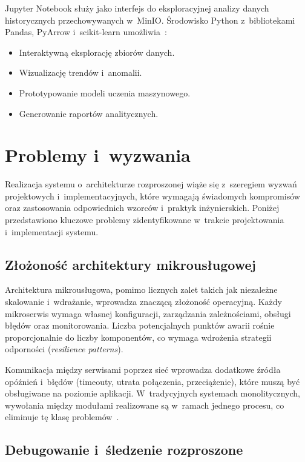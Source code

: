 Jupyter Notebook służy jako interfejs do eksploracyjnej analizy danych historycznych przechowywanych w~MinIO\@.
Środowisko Python z~bibliotekami Pandas, PyArrow i~scikit-learn umożliwia~\cite{jupyter_docs}:
\begin{itemize}
    \item Interaktywną eksplorację zbiorów danych.
    \item Wizualizację trendów i~anomalii.
    \item Prototypowanie modeli uczenia maszynowego.
    \item Generowanie raportów analitycznych.
\end{itemize}


\section[Problemy i wyzwania]{Problemy i~wyzwania}
\label{sec:problemy_wyzwania}

Realizacja systemu o~architekturze rozproszonej wiąże się z~szeregiem wyzwań projektowych i~implementacyjnych,
które wymagają świadomych kompromisów oraz zastosowania odpowiednich wzorców i~praktyk inżynierskich.
Poniżej przedstawiono kluczowe problemy zidentyfikowane w~trakcie projektowania i~implementacji systemu.

\subsection{Złożoność architektury mikrousługowej}
\label{subsec:zlozonosc_mikrouslug}

Architektura mikrousługowa, pomimo licznych zalet takich jak niezależne skalowanie i~wdrażanie, wprowadza znaczącą
złożoność operacyjną.
Każdy mikroserwis wymaga własnej konfiguracji, zarządzania zależnościami, obsługi błędów oraz monitorowania.
Liczba potencjalnych punktów awarii rośnie proporcjonalnie do liczby komponentów, co wymaga wdrożenia strategii
odporności (\textit{resilience patterns}).

Komunikacja między serwisami poprzez sieć wprowadza dodatkowe źródła opóźnień i~błędów (timeouty, utrata połączenia,
przeciążenie), które muszą być obsługiwane na poziomie aplikacji.
W~tradycyjnych systemach monolitycznych, wywołania między modułami realizowane są w~ramach jednego procesu, co
eliminuje tę klasę problemów~\cite{newman_building_microservices}.

\subsection[Debugowanie i śledzenie rozproszone]{Debugowanie i~śledzenie rozproszone}
\label{subsec:debugowanie}

